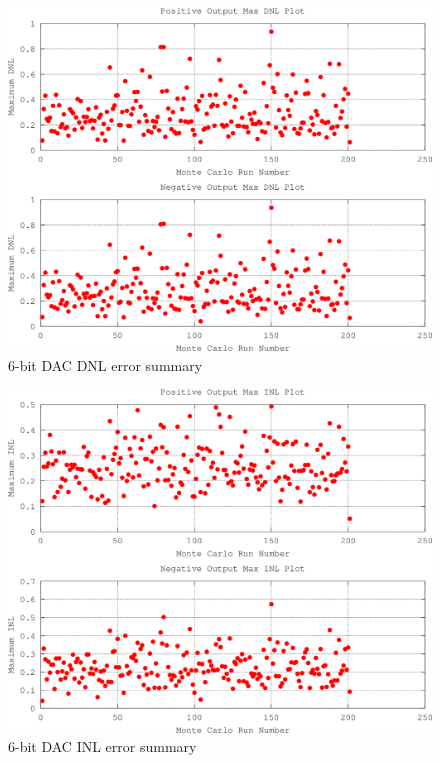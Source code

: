 \documentclass[12pt,oneside,final]{siuethesis}
\theoremstyle{definition}
\begin{document}
\begin{figure}[htbp!]
 \centering
 \includegraphics[scale=.31]{./ch4_figures/dnl_summary.png}
 \caption{6-bit DAC DNL error summary}
 \label{fig:dnl}
\end{figure} 

\begin{figure}[htbp!]
 \centering
 \includegraphics[scale=.31]{./ch4_figures/inl_summary.png}
 \caption{6-bit DAC INL error summary}
 \label{fig:inl}
\end{figure} 
\end{document}
